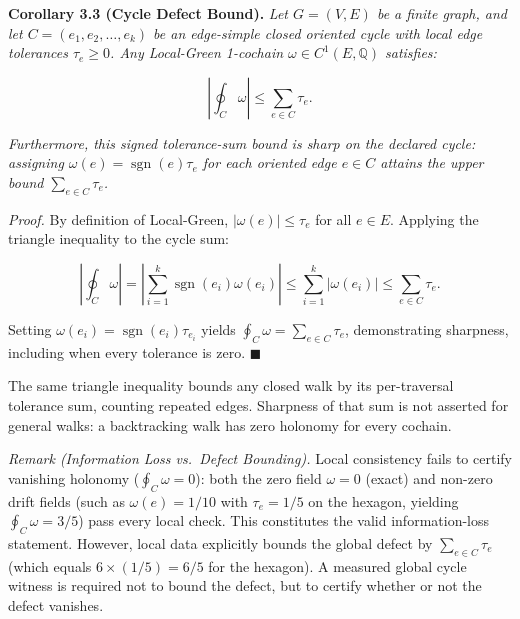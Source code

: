 \documentclass[
  10pt,
]{article}
\begin{document}
\textbf{Corollary 3.3 (Cycle Defect Bound).} \emph{Let \hypertarget{math-E0062-0158}{}{\(G = (V, E)\)} be a finite graph, and let \hypertarget{math-E0083-0159}{}{\(C = (e_1, e_2, \ldots, e_k)\)} be an edge-simple closed oriented cycle with local edge tolerances \hypertarget{math-E0078-0160}{}{\(\tau_e \ge 0\)}. Any Local-Green 1-cochain \hypertarget{math-E0081-0161}{}{\(\omega \in C^1(E, \mathbb{Q})\)} satisfies:}

\hypertarget{math-E0123-0162}{}{\[\left|\oint_C \omega\right| \le \sum_{e \in C} \tau_e.\]}

\emph{Furthermore, this signed tolerance-sum bound is sharp on the declared cycle: assigning \hypertarget{math-E0124-0163}{}{\(\omega(e) = \operatorname{sgn}(e) \tau_e\)} for each oriented edge \hypertarget{math-E0102-0164}{}{\(e \in C\)} attains the upper bound \hypertarget{math-E0125-0165}{}{\(\sum_{e \in C} \tau_e\)}.}

\emph{Proof.} By definition of Local-Green, \hypertarget{math-E0100-0166}{}{\(|\omega(e)| \le \tau_e\)} for all \hypertarget{math-E0076-0167}{}{\(e \in E\)}. Applying the triangle inequality to the cycle sum:

\hypertarget{math-E0126-0168}{}{\[\left|\oint_C \omega\right| = \left|\sum_{i=1}^k \operatorname{sgn}(e_i) \omega(e_i)\right| \le \sum_{i=1}^k |\omega(e_i)| \le \sum_{e \in C} \tau_e.\]}

Setting \hypertarget{math-E0127-0169}{}{\(\omega(e_i) = \operatorname{sgn}(e_i) \tau_{e_i}\)} yields \hypertarget{math-E0128-0170}{}{\(\oint_C \omega = \sum_{e \in C} \tau_e\)}, demonstrating sharpness, including when every tolerance is zero. \hypertarget{math-E0035-0171}{}{\(\blacksquare\)}

The same triangle inequality bounds any closed walk by its per-traversal tolerance sum, counting repeated edges. Sharpness of that sum is not asserted for general walks: a backtracking walk has zero holonomy for every cochain.

\emph{Remark (Information Loss vs.~Defect Bounding).} Local consistency fails to certify vanishing holonomy (\hypertarget{math-E0129-0172}{}{\(\oint_C \omega = 0\)}): both the zero field \hypertarget{math-E0130-0173}{}{\(\omega = 0\)} (exact) and non-zero drift fields (such as \hypertarget{math-E0131-0174}{}{\(\omega(e) = 1/10\)} with \hypertarget{math-E0132-0175}{}{\(\tau_e = 1/5\)} on the hexagon, yielding \hypertarget{math-E0133-0176}{}{\(\oint_C \omega = 3/5\)}) pass every local check. This constitutes the valid information-loss statement. However, local data explicitly bounds the global defect by \hypertarget{math-E0125-0177}{}{\(\sum_{e \in C} \tau_e\)} (which equals \hypertarget{math-E0134-0178}{}{\(6 \times (1/5) = 6/5\)} for the hexagon). A measured global cycle witness is required not to bound the defect, but to certify whether or not the defect vanishes.
\end{document}
